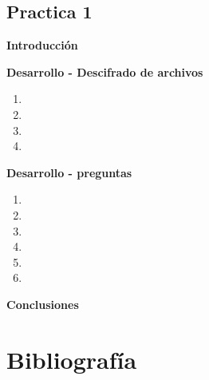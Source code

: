 \documentclass[11pt,letterpaper]{article}
\begin{document}
	
    
    
    \begin{center}
	\section*{\LARGE{Practica 1}}
    \end{center}

    \begin{center}
        \LARGE{\textbf{Introducción}}\\
    \end{center}
    \normalsize
    

    
    \begin{center}
        \LARGE{\textbf{Desarrollo - Descifrado de archivos}}\\
    \end{center}
    \normalsize
    \begin{enumerate}
        \item 
        \item 
        \item 
        \item 
    \end{enumerate}
    

    \begin{center}
        \LARGE{\textbf{Desarrollo - preguntas}}\\
    \end{center}
    \normalsize
    \begin{enumerate}
        \item 
        \item 
        \item 
        \item 
        \item 
        \item 
    \end{enumerate}

    \begin{center}
        \LARGE{\textbf{Conclusiones}}\\
    \end{center}
    \normalsize
    

    
\newpage

\Large \section*{Bibliografía}
  
  
  
    
	
\end{document}
